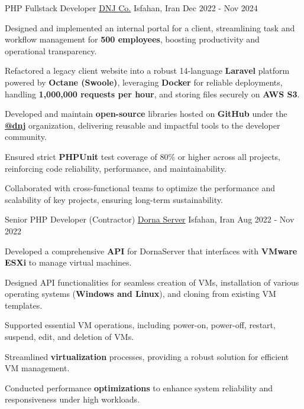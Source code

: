 \begin{cventries}
  \cventry
    {PHP Fullstack Developer} %
    {\href{https://dnj.co.ir}{DNJ Co.}} %
    {Isfahan, Iran} %
    {Dec 2022 - Nov 2024} %
    {
      \begin{cvitems}
        \item {Designed and implemented an internal portal for a client, streamlining task and workflow management for \textbf{500 employees}, boosting productivity and operational transparency.}
        \item {Refactored a legacy client website into a robust 14-language \textbf{Laravel} platform powered by \textbf{Octane (Swoole)}, leveraging \textbf{Docker} for reliable deployments, handling \textbf{1,000,000 requests per hour}, and storing files securely on \textbf{AWS S3}.}
        \item {Developed and maintain \textbf{open-source} libraries hosted on \textbf{GitHub} under the \textbf{\href{https://github.com/dnj}{\faGithubSquare\acvHeaderIconSep @dnj}} organization, delivering reusable and impactful tools to the developer community.}
        \item {Ensured strict \textbf{PHPUnit} test coverage of 80\% or higher across all projects, reinforcing code reliability, performance, and maintainability.}
        \item {Collaborated with cross-functional teams to optimize the performance and scalability of key projects, ensuring long-term sustainability.}
      \end{cvitems}
    }

  \cventry
    {Senior PHP Developer (Contractor)} %
    {\href{https://dornaserver.com/}{Dorna Server}} %
    {Isfahan, Iran} %
    {Aug 2022 - Nov 2022} %
    {
      \begin{cvitems}
        \item {Developed a comprehensive \textbf{API} for DornaServer that interfaces with \textbf{VMware ESXi} to manage virtual machines.}
        \item {Designed API functionalities for seamless creation of VMs, installation of various operating systems (\textbf{Windows and Linux}), and cloning from existing VM templates.}
        \item {Supported essential VM operations, including power-on, power-off, restart, suspend, edit, and deletion of VMs.}
        \item {Streamlined \textbf{virtualization} processes, providing a robust solution for efficient VM management.}
        \item {Conducted performance \textbf{optimizations} to enhance system reliability and responsiveness under high workloads.}
      \end{cvitems}
    }


\end{cventries}
